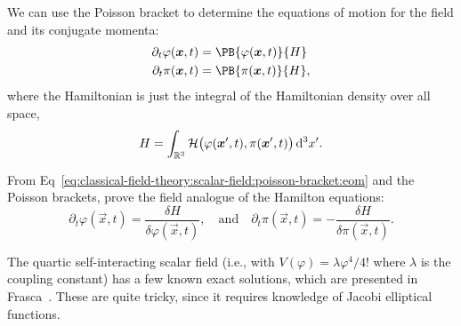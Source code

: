 We can use the Poisson bracket to determine the equations of motion for
the field and its conjugate momenta:
\begin{subequations}\label{eq:classical-field-theory:scalar-field:poisson-bracket:eom}
\begin{align}
\partial_{t}\varphi(\vec{x},t) &= \PB{\varphi(\vec{x},t)}{H}\\
\partial_{t}\pi(\vec{x},t)     &= \PB{\pi(\vec{x},t)}{H},
\end{align}
\end{subequations}
where the Hamiltonian is just the integral of the Hamiltonian density
over all space,
\begin{equation}
H = \int_{\mathbb{R}^{3}}\mathcal{H}\bigl(\varphi(\boldsymbol{x}',t), \pi(\boldsymbol{x}',t)\bigr)\,\mathrm{d}^{3}x'.
\end{equation}

\begin{exercise}
From Eq~\eqref{eq:classical-field-theory:scalar-field:poisson-bracket:eom}
and the Poisson brackets, prove the field analogue of the Hamilton equations:
\begin{equation}
\partial_{t}\varphi(\vec{x},t) = \frac{\delta H}{\delta\varphi(\vec{x},t)},
\quad\mbox{and}\quad
\partial_{t}\pi(\vec{x},t) = -\frac{\delta H}{\delta\pi(\vec{x},t)}.
\end{equation}
\end{exercise}


The quartic self-interacting scalar field (i.e., with
$V(\varphi)=\lambda\varphi^{4}/4!$ where $\lambda$ is the coupling
constant) has a few known exact solutions, which are presented in
Frasca~\cite{Frasca:2009bc}. These are quite tricky, since it requires
knowledge of Jacobi elliptical functions.